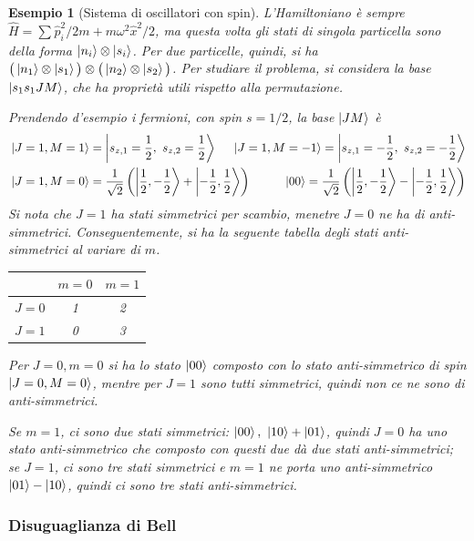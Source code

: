 \documentclass[11pt, a4paper]{scrartcl} %
\numberwithin{equation}{subsection}
\theoremstyle{style2}
\theoremstyle{style1}
\newtheorem{esempio}{Esempio}[section]
\begin{document}
\begin{esempio}
	[Sistema di oscillatori con spin]
	L'Hamiltoniano \`e sempre $\hat{H} = \sum_{}^{} \hat{p}_i^2 / 2m + m\omega^2 \hat{x}^2 / 2$, ma questa volta gli stati di singola particella sono della forma $\ket{n_i} \otimes \ket{s_i} $.
	Per due particelle, quindi, si ha $\big(\ket{n_1} \otimes \ket{s_1} \big)\otimes \big(\ket{n_2} \otimes \ket{s_2} \big)$.
	Per studiare il problema, si considera la base $\ket{s_1s_1 JM} $, che ha propriet\`a utili rispetto alla permutazione. 
	
	Prendendo d'esempio i fermioni, con spin $ s =1  / 2$, la base $\ket{JM} $ \`e
	\[
		\begin{split}
			&\ket{J=1,M=1} = \Ket{s_{z,1} = \frac{1}{2}, \ s_{z,2} = \frac{1}{2}} \hspace{.5cm}\ket{J=1,M=-1} = \Ket{s_{z,1} = -\frac{1}{2}, \ s_{z,2} = -\frac{1}{2}}\\
			&\ket{J=1, M=0} = \frac{1}{\sqrt{2} } \left(\Ket{\frac{1}{2}, -\frac{1}{2}}  + \Ket{-\frac{1}{2}, \frac{1}{2}} \right) \hspace{1cm} \ket{00} =\frac{1}{\sqrt{2} } \left(\Ket{\frac{1}{2}, -\frac{1}{2}}  - \Ket{-\frac{1}{2}, \frac{1}{2}} \right)
		\end{split}
	\] 
	Si nota che $J=1$ ha stati simmetrici per scambio, menetre $J=0$ ne ha di anti-simmetrici. 
	Conseguentemente, si ha la seguente tabella degli stati anti-simmetrici al variare di $m$.
	\begin{table}[h!]
		\centering
		\begin{tabular}{c | c | c}
			& $m=0$ & $m=1$\\
		\hline
			$J=0$ & 1 & 2  \\
			$J=1$ & 0 & 3  \\
		\hline
		\end{tabular}
	\end{table}

\noindent 	Per $J=0,m=0$ si ha lo stato $\ket{00} $ composto con lo stato anti-simmetrico di spin $\ket{J=0, M=0} $, mentre per $J=1$ sono tutti simmetrici, quindi non ce ne sono di anti-simmetrici. 

Se $m=1$, ci sono due stati simmetrici: $\ket{00}, \ \ket{10} + \ket{01} $, quindi $J=0$ ha uno stato anti-simmetrico che composto con questi due d\`a due stati anti-simmetrici; se $J=1$, ci sono tre stati simmetrici e $m=1$ ne porta uno anti-simmetrico $\ket{01} - \ket{10} $, quindi ci sono tre stati anti-simmetrici.
\end{esempio}
\subsubsection{Disuguaglianza di Bell}
\end{document}
